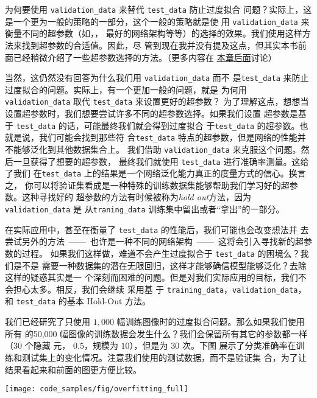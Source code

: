 \label{validation_explanation}
为何要使用 \lstinline!validation_data! 来替代 \lstinline!test_data! 防止过度拟合
问题？实际上，这是一个更为一般的策略的一部分，这个一般的策略就是使
用 \lstinline!validation_data! 来衡量不同的超参数（如\epochs{}，\learningrate{}，
最好的网络架构等等）的选择的效果。我们使用这样方法来找到超参数的合适值。因此，尽
管到现在我并没有提及这点，但其实本书前面已经稍微介绍了一些超参数选择的方法。（更多内容在%
\hyperref[sec:how_to_choose_a_neural_network's_hyper-parameters]{本章后面}讨论）

当然，这仍然没有回答为什么我们用 \lstinline!validation_data! 而不
是\lstinline!test_data! 来防止过度拟合的问题。实际上，有一个更加一般的问题，就是
为何用 \lstinline!validation_data! 取代 \lstinline!test_data! 来设置更好的超参数？
为了理解这点，想想当设置超参数时，我们想要尝试许多不同的超参数选择。如果我们设置
超参数是基于 \lstinline!test_data! 的话，可能最终我们就会得到过度拟合
于\lstinline!test_data!  的超参数。也就是说，我们可能会找到那些符
合\lstinline!test_data! 特点的超参数，但是网络的性能并不能够泛化到其他数据集合上。
我们借助 \lstinline!validation_data! 来克服这个问题。然后一旦获得了想要的超参数，
最终我们就使用 \lstinline!test_data! 进行准确率测量。这给了我们
在\lstinline!test_data! 上的结果是一个网络泛化能力真正的度量方式的信心。换言之，
你可以将验证集看成是一种特殊的训练数据集能够帮助我们学习好的超参数。这种寻找好的
超参数的方法有时候被称为\emph{hold out}方法，因为 \lstinline!validation_data! 是
从\lstinline!traning_data! 训练集中留出或者“拿出”的一部分。

在实际应用中，甚至在衡量了 \lstinline!test_data! 的性能后，我们可能也会改变想法并
去尝试另外的方法~——~也许是一种不同的网络架构~——~这将会引入寻找新的超参数的过程。
如果我们这样做，难道不会产生过度拟合于 \lstinline!test_data! 的困境么？我们是不是
需要一种数据集的潜在无限回归，这样才能够确信模型能够泛化？去除这样的疑惑其实是一
个深刻而困难的问题。但是对我们实际应用的目标，我们不会担心太多。相反，我们会继续
采用基
于 \lstinline!training_data!，\lstinline!validation_data!，和
\lstinline!test_data! 的基本 Hold-Out 方法。

我们已经研究了只使用 $1,000$ 幅训练图像时的过度拟合问题。那么如果我们使用所有
的50,000 幅图像的训练数据会发生什么？我们会保留所有其它的参数都一样（$30$ 个隐藏
元，\learningrate{} $0.5$，\minibatch{}规模为 $10$），但是\epochs{}为 30 次。下图
展示了分类准确率在训练和测试集上的变化情况。注意我们使用的测试数据，而不是验证集
合，为了让结果看起来和前面的图更方便比较。
\begin{center}
  \texttt{[image: code\_samples/fig/overfitting\_full]}
\end{center}

